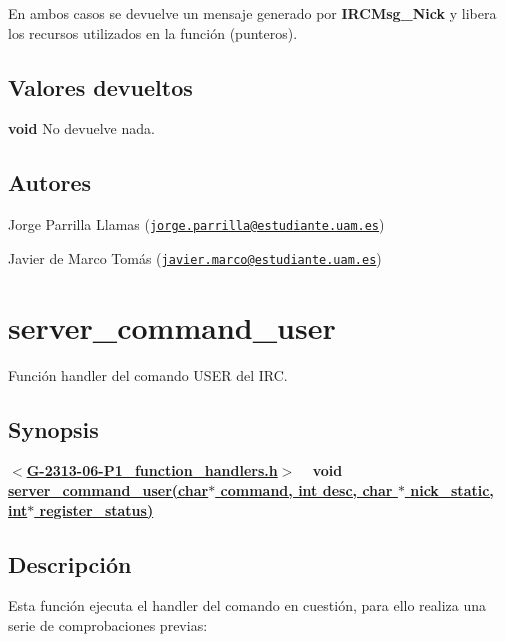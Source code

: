En ambos casos se devuelve un mensaje generado por {\bfseries I\+R\+C\+Msg\+\_\+\+Nick} y libera los recursos utilizados en la función (punteros). \hypertarget{server_command_nick_return_nick}{}\subsection{Valores devueltos}\label{server_command_nick_return_nick}

\begin{DoxyItemize}
\item {\bfseries void} No devuelve nada. 
\end{DoxyItemize}\hypertarget{server_command_nick_authors_nick}{}\subsection{Autores}\label{server_command_nick_authors_nick}

\begin{DoxyItemize}
\item Jorge Parrilla Llamas (\href{mailto:jorge.parrilla@estudiante.uam.es}{\tt jorge.\+parrilla@estudiante.\+uam.\+es}) 
\item Javier de Marco Tomás (\href{mailto:javier.marco@estudiante.uam.es}{\tt javier.\+marco@estudiante.\+uam.\+es}) 
\end{DoxyItemize}\hypertarget{server_command_user}{}\section{server\+\_\+command\+\_\+user}\label{server_command_user}
Función handler del comando U\+S\+ER del I\+RC.\hypertarget{server_command_user_synopsis_user}{}\subsection{Synopsis}\label{server_command_user_synopsis_user}
{ {\bfseries $<$\hyperlink{G-2313-06-P1__function__handlers_8h}{G-\/2313-\/06-\/\+P1\+\_\+function\+\_\+handlers.\+h}$>$} ~\newline
 {\bfseries void \hyperlink{G-2313-06-P1__function__handlers_8c_ad09156d6bd4cf58f4345e0bf851ff099}{server\+\_\+command\+\_\+user(char$\ast$ command, int desc, char $\ast$ nick\+\_\+static, int$\ast$ register\+\_\+status)}} } \hypertarget{server_command_user_descripcion_user}{}\subsection{Descripción}\label{server_command_user_descripcion_user}
Esta función ejecuta el handler del comando en cuestión, para ello realiza una serie de comprobaciones previas\+:


